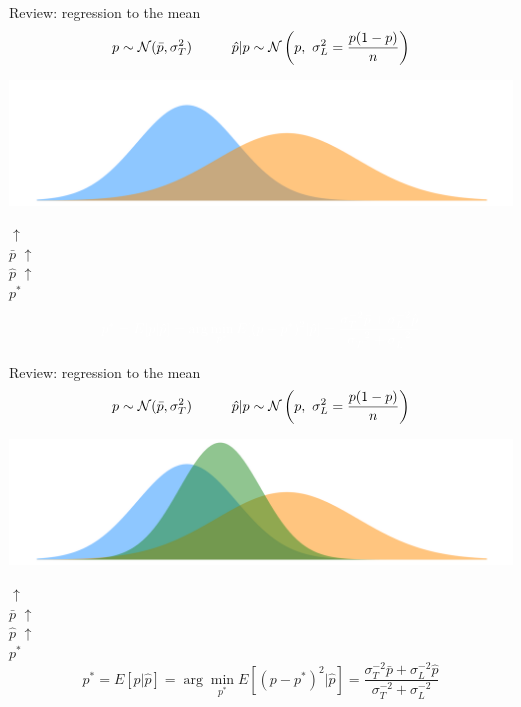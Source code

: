 \documentclass{beamer}
\def\l{\left}\def\r{\right}\def\lf{\lfloor}\def\rf{\rfloor}
\begin{document}
\begin{frame}{Review: regression to the mean}
$$p \sim \N(\bar p, \sigma^2_T) \hspace{1cm}
\hat p|p \sim \N\l(p,~\sigma^2_L = \frac{p(1-p)}{n}\r)$$
\begin{center}
\includegraphics[width = \textwidth]{../figs/talent-skill.pdf}
\end{center}
\vspace{-6mm}\tabto*{37mm}$\uparrow$\\
\tabto*{37mm}$\bar p$
\vspace{-5mm}\tabto*{58mm}$\uparrow$\\
\tabto*{57.5mm}$\hat p$
{\color{white}
\vspace{-4.5mm}\tabto*{44mm}$\uparrow$\\
\tabto*{44mm}$p^*$\\}
$${\color{white} p^* = E[p|\hat p] = \arg\min_{p^*}{E[(p - p^*)^2|\hat p]}
    = \frac{\sigma_T^{-2}\bar p + \sigma_L^{-2}\hat p}
    {\sigma_T^{-2} + \sigma_L^{-2}}}$$
\end{frame}

\begin{frame}{Review: regression to the mean}
$$p \sim \N(\bar p, \sigma^2_T) \hspace{1cm}
\hat p|p \sim \N\l(p,~\sigma^2_L = \frac{p(1-p)}{n}\r)$$
\begin{center}
\includegraphics[width = \textwidth]{../figs/talent-skill-post.pdf}
\end{center}
\vspace{-6mm}\tabto*{37mm}$\uparrow$\\
\tabto*{37mm}$\bar p$
\vspace{-5mm}\tabto*{58mm}$\uparrow$\\
\tabto*{57.5mm}$\hat p$
\vspace{-4.5mm}\tabto*{44mm}$\uparrow$\\
\tabto*{44mm}$p^*$\\
$$p^* = E[p|\hat p] = \arg\min_{p^*}{E[(p - p^*)^2|\hat p]}
    = \frac{\sigma_T^{-2}\bar p + \sigma_L^{-2}\hat p}
    {\sigma_T^{-2} + \sigma_L^{-2}}$$
\end{frame}
\end{document}
